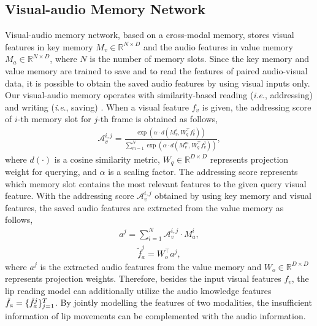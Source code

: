 \documentclass[letterpaper]{article} \usepackage{aaai22}  \usepackage{times}  \usepackage{helvet}  \usepackage{courier}  \usepackage[hyphens]{url}  \usepackage{graphicx} \urlstyle{rm} \def\UrlFont{\rm}  \usepackage{natbib}  \usepackage{caption} \DeclareCaptionStyle{ruled}{labelfont=normalfont,labelsep=colon,strut=off} \frenchspacing  \setlength{\pdfpagewidth}{8.5in}  \setlength{\pdfpageheight}{11in}  \usepackage{algorithm}
\newcommand{\ie}{\textit{i}.\textit{e}.}
\begin{document}
\subsection{Visual-audio Memory Network}
Visual-audio memory network, based on a cross-modal memory, stores visual features in key memory $M_v \in \mathbb{R}^{N\times D}$ and the audio features in value memory $M_a \in \mathbb{R}^{N\times D}$, where $N$ is the number of memory slots. Since the key memory and value memory are trained to save and to read the features of paired audio-visual data, it is possible to obtain the saved audio features by using visual inputs only. Our visual-audio memory operates with similarity-based reading (\ie, addressing) and writing (\ie, saving) \cite{kim2021visualaudiomem, lee2021videopredictionmem}. When a visual feature $f_v$ is given, the addressing score of $i$-th memory slot for $j$-th frame is obtained as follows,
\begin{align}
\label{eq:1}
    \mathcal{A}_v^{i,j} = \frac{\exp(\alpha\cdot d(M_v^i,W_q^\top f_v^j))}{\sum_{m=1}^N \exp(\alpha\cdot d(M_v^m,W_q^\top f_v^j))},
\end{align}
where $d(\cdot)$ is a cosine similarity metric, $W_q \in \mathbb{R}^{D \times D}$ represents projection weight for querying, and $\alpha$ is a scaling factor. The addressing score represents which memory slot contains the most relevant features to the given query visual feature. With the addressing score $\mathcal{A}_v^{i,j}$ obtained by using key memory and visual features, the saved audio features are extracted from the value memory as follows,
\begin{align}
    a^j = \sum_{i=1}^N\mathcal{A}_v^{i,j} \cdot M_a^i,
\end{align}
\begin{align}
    \tilde{f}_a^j = W_o^\top a^j,
\end{align}
where $a^j$ is the extracted audio features from the value memory and $W_o\in \mathbb{R}^{D\times D}$ represents projection weights. Therefore, besides the input visual features $f_v$, the lip reading model can additionally utilize the audio knowledge features $\Tilde{f}_a=\{\Tilde{f}_a^j\}_{j=1}^T$. By jointly modelling the features of two modalities, the insufficient information of lip movements can be complemented with the audio information.
\end{document}
